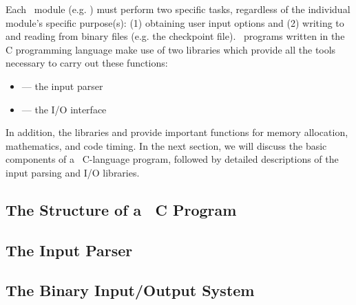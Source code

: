 %
%
%
%

Each \PSIthree\ module (e.g. \PSIcscf) must perform two specific
tasks, regardless of the individual module's specific purpose(s): (1)
obtaining user input options and (2) writing to and reading from
binary files (e.g. the checkpoint file).  \PSIthree\ programs written
in the C programming language make use of two libraries which
provide all the tools necessary to carry out these functions:
\begin{itemize}
\item {} --- the input parser
\item {} --- the I/O interface
\end{itemize}
In addition, the libraries  and 
provide important functions for memory allocation, mathematics, and
code timing.  In the next section, we will discuss the basic
components of a \PSIthree\ C-language program, followed by detailed
descriptions of the input parsing and I/O libraries.

\subsection{The Structure of a \PSIthree\ C Program}\label{C_Program}


\subsection{The Input Parser}\label{C_IP}


\subsection{The Binary Input/Output System}\label{C_IO_New}


%

